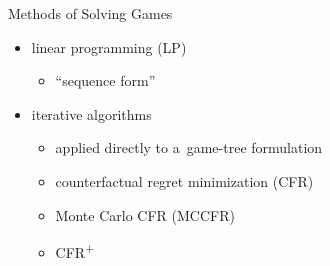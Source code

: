 \documentclass{beamer}
\theoremstyle{definition}
\newcommand{\cfrplus}{CFR\textsuperscript{+}~}
\begin{document}

  \begin{frame}{Methods of Solving Games}
    \begin{itemize}[<+- | alert@+>]
      \item linear programming (LP)
        \begin{itemize}
          \item ``sequence form''
        \end{itemize}
      \item iterative algorithms 
        \begin{itemize}
          \item applied directly to a~game-tree formulation
          \item counterfactual regret minimization (CFR)
          \item Monte Carlo CFR (MCCFR)
          \item \cfrplus
        \end{itemize}
    \end{itemize}
  \end{frame}

\end{document}
